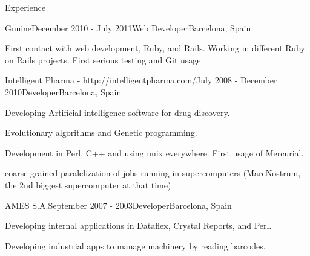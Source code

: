 \documentclass{resume} %
\begin{document}
\begin{rSection}{Experience}

\begin{rSubsection}{Gnuine}{December 2010 - July 2011}{Web Developer}{Barcelona, Spain}
\item First contact with web development, Ruby, and Rails. Working in
  different Ruby on Rails projects. First serious testing and Git
  usage.
\end{rSubsection}


\begin{rSubsection}{Intelligent Pharma - http://intelligentpharma.com/}{July 2008 - December 2010}{Developer}{Barcelona, Spain}
\item Developing Artificial intelligence software for drug discovery.
\item Evolutionary algorithms and Genetic programming.
\item Development in Perl, C++ and using unix everywhere. First usage of Mercurial.
\item coarse grained paralelization of jobs running in supercomputers
  (MareNostrum, the 2nd biggest supercomputer at that time)
\end{rSubsection}


\begin{rSubsection}{AMES S.A.}{September 2007 - 2003}{Developer}{Barcelona, Spain}
\item Developing internal applications in Dataflex, Crystal Reports, and Perl.
\item Developing industrial apps to manage machinery by reading barcodes.
\end{rSubsection}

\end{rSection}

\end{document}
